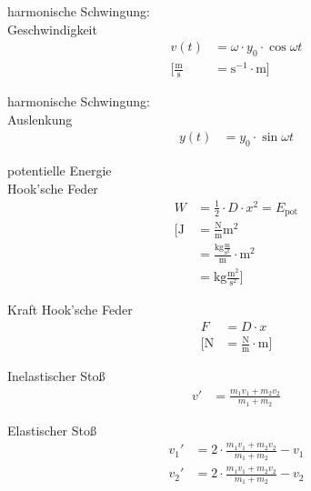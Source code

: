 \begin{karte}{harmonische Schwingung:\\Geschwindigkeit}
    \begin{align*}
        v(t) &= \omega \cdot y_0 \cdot \cos \omega t \\
        \bigg[ \frac{\text{m}}{\text{s}} &= \text{s}^{-1} \cdot \text{m} \bigg]
    \end{align*}
\end{karte}

\begin{karte}{harmonische Schwingung:\\Auslenkung}
    \begin{align*}
        y(t) &= y_0 \cdot \sin \omega t
    \end{align*}
\end{karte}

\begin{karte}{potentielle Energie\\Hook'sche Feder}
    \begin{align*}
        W &= \frac{1}{2}\cdot D\cdot x^2 = E_\text{pot} \\
        \bigg[ \text{J} &= \frac{\text{N}}{\text{m}} \text{m}^2 \\
        &= \frac{\text{kg}\frac{\text{m}}{\text{s}^2}}{\text{m}} \cdot \text{m}^2 \\
        &= \text{kg}\frac{\text{m}^2}{\text{s}^2} \bigg]
    \end{align*}
\end{karte}

\begin{karte}{Kraft Hook'sche Feder}
    \begin{align*}
        F &= D \cdot x \\
        \bigg[ \text{N} &= \frac{\text{N}}{\text{m}} \cdot \text{m} \bigg]
    \end{align*}
\end{karte}

\begin{karte}{Inelastischer Stoß}
    \begin{align*}
        v' &= \frac{ m_1v_1+m_2v_2}{m_1+m_2}
    \end{align*}
\end{karte}

\begin{karte}{Elastischer Stoß}
    \begin{align*}
        v_1'&= 2 \cdot \frac{m_1v_1 + m_2v_2}{m_1+m_2}- v_1 \\
        v_2'&= 2 \cdot \frac{m_1v_1 + m_2v_2}{m_1+m_2}- v_2 \\
    \end{align*}
\end{karte}

